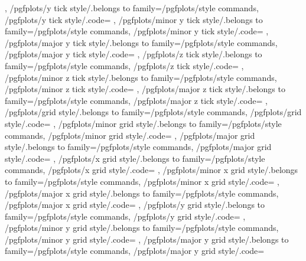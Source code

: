 {{	},
	/pgfplots/y tick style/.belongs to family=/pgfplots/style commands,
	/pgfplots/y tick style/.code={%
	},
	/pgfplots/minor y tick style/.belongs to family=/pgfplots/style commands,
	/pgfplots/minor y tick style/.code={%
	},
	/pgfplots/major y tick style/.belongs to family=/pgfplots/style commands,
	/pgfplots/major y tick style/.code={%
	},
	/pgfplots/z tick style/.belongs to family=/pgfplots/style commands,
	/pgfplots/z tick style/.code={%
	},
	/pgfplots/minor z tick style/.belongs to family=/pgfplots/style commands,
	/pgfplots/minor z tick style/.code={%
	},
	/pgfplots/major z tick style/.belongs to family=/pgfplots/style commands,
	/pgfplots/major z tick style/.code={%
	},
	/pgfplots/grid style/.belongs to family=/pgfplots/style commands,
	/pgfplots/grid style/.code={%
	},
	/pgfplots/minor grid style/.belongs to family=/pgfplots/style commands,
	/pgfplots/minor grid style/.code={%
	},
	/pgfplots/major grid style/.belongs to family=/pgfplots/style commands,
	/pgfplots/major grid style/.code={%
	},
	/pgfplots/x grid style/.belongs to family=/pgfplots/style commands,
	/pgfplots/x grid style/.code={%
	},
	/pgfplots/minor x grid style/.belongs to family=/pgfplots/style commands,
	/pgfplots/minor x grid style/.code={%
	},
	/pgfplots/major x grid style/.belongs to family=/pgfplots/style commands,
	/pgfplots/major x grid style/.code={%
	},
	/pgfplots/y grid style/.belongs to family=/pgfplots/style commands,
	/pgfplots/y grid style/.code={%
	},
	/pgfplots/minor y grid style/.belongs to family=/pgfplots/style commands,
	/pgfplots/minor y grid style/.code={%
	},
	/pgfplots/major y grid style/.belongs to family=/pgfplots/style commands,
	/pgfplots/major y grid style/.code={%
}}
